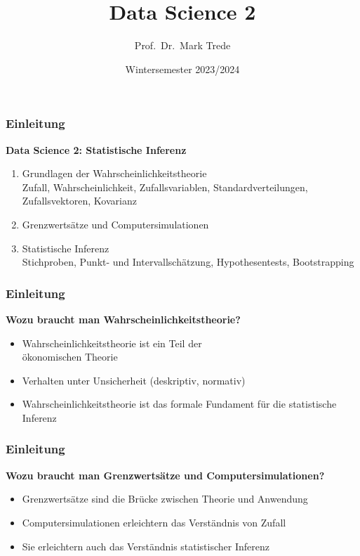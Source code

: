\documentclass[12pt,show notes]{beamer}
\begin{document}
\title{Data Science 2}
\author{Prof.~Dr.~Mark Trede}
\date{Wintersemester 2023/2024}
\maketitle

\begin{frame}
\frametitle{Einleitung}
\textbf{Data Science 2: Statistische Inferenz}\\\medskip
\begin{enumerate}
\item Grundlagen der Wahrscheinlichkeitstheorie\\
{\footnotesize Zufall, Wahrscheinlichkeit, Zufallsvariablen, Standardverteilungen,
Zufallsvektoren, Kovarianz}
\item Grenzwertsätze und Computersimulationen
\item Statistische Inferenz\\
{\footnotesize Stichproben, Punkt- und Intervallschätzung, Hypothesentests, Bootstrapping}
\end{enumerate}
\end{frame}

\begin{frame}
\frametitle{Einleitung}
\textbf{Wozu braucht man Wahrscheinlichkeitstheorie?}\\\medskip
\begin{itemize}
\item Wahrscheinlichkeitstheorie ist ein Teil der\\  ökonomischen Theorie
\item Verhalten unter Unsicherheit (deskriptiv, normativ)
\item Wahrscheinlichkeitstheorie ist das formale Fundament 
für die statistische Inferenz
\end{itemize}
\end{frame}

\begin{frame}
\frametitle{Einleitung}
\textbf{Wozu braucht man Grenzwertsätze und Computersimulationen?}\\\medskip
\begin{itemize}
\item Grenzwertsätze sind die Brücke zwischen Theorie und Anwendung
\item Computersimulationen erleichtern das Verständnis von Zufall
\item Sie erleichtern auch das Verständnis statistischer Inferenz
\end{itemize}
\end{frame}
\end{document}
